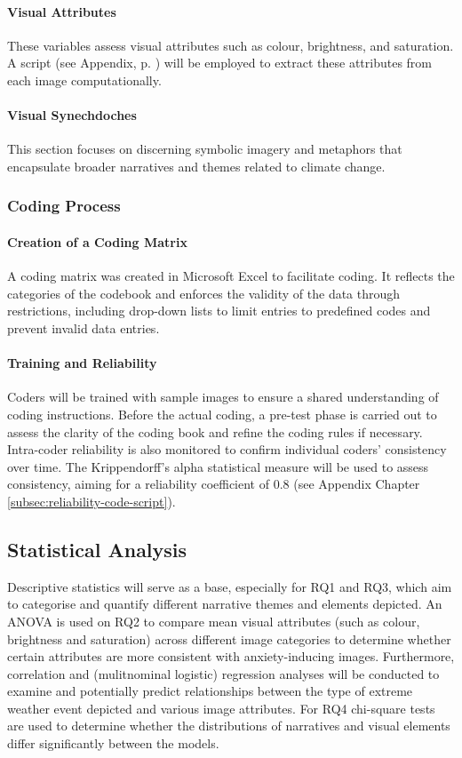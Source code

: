 \paragraph{Visual Attributes}
\label{subsubsec:coding-visual-attributes}
These variables assess visual attributes such as colour, brightness, and saturation. A script (see Appendix, p. \pageref{subsec:visual-attribute-detection})  will be employed to extract these attributes from each image computationally.

\paragraph{Visual Synechdoches}
This section focuses on discerning symbolic imagery and metaphors that encapsulate broader narratives and themes related to climate change.

\subsubsection{Coding Process}
\label{subsubsec:coding-process}

\paragraph{Creation of a Coding Matrix}
A coding matrix was created in Microsoft Excel to facilitate coding. It reflects the categories of the codebook and enforces the validity of the data through restrictions, including drop-down lists to limit entries to predefined codes and prevent invalid data entries.
 
\paragraph{Training and Reliability}
Coders will be trained with sample images to ensure a shared understanding of coding instructions. Before the actual coding, a pre-test phase is carried out to assess the clarity of the coding book and refine the coding rules if necessary. Intra-coder reliability is also monitored to confirm individual coders' consistency over time. The Krippendorff's alpha statistical measure will be used to assess consistency, aiming for a reliability coefficient of $0.8$ (see Appendix Chapter \ref{subsec:reliability-code-script}).

\subsection{Statistical Analysis}
Descriptive statistics will serve as a base, especially for RQ1 and RQ3, which aim to categorise and quantify  different narrative themes and elements depicted. An ANOVA is used on RQ2 to compare mean visual attributes (such as colour, brightness and saturation) across different image categories to determine whether certain attributes are more consistent with anxiety-inducing images. Furthermore, correlation and (mulitnominal logistic) regression analyses will be conducted to examine and potentially predict relationships between the type of extreme weather event depicted and various image attributes. For RQ4 chi-square tests are used to determine whether the distributions of narratives and visual elements differ significantly between the models.